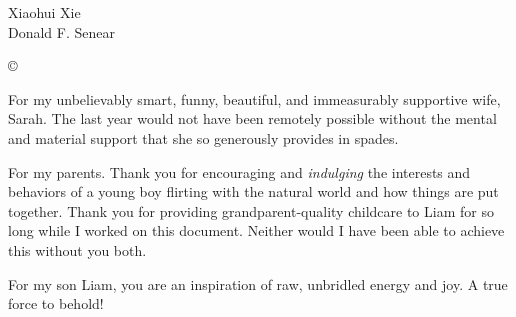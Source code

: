 



\othercommitteemembers
{
  Xiaohui Xie\\
  Donald F. Senear
}


\copyrightdeclaration
{
  {\copyright} {\Degreeyear} \Authorname
}


\dedications
{

For my unbelievably smart, funny, beautiful, and immeasurably supportive wife, Sarah.
The last year would not have been remotely possible without the mental and material support that she so generously provides in spades. 

For my parents.
Thank you for encouraging and \textit{indulging} the interests and behaviors of a young boy flirting with the natural world and how things are put together.
Thank you for providing grandparent-quality childcare to Liam for so long while I worked on this document.
Neither would I have been able to achieve this without you both.

For my son Liam, you are an inspiration of raw, unbridled energy and joy.
A true force to behold!
}

